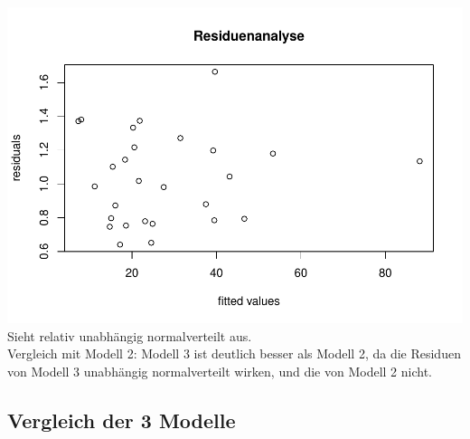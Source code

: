 \documentclass[]{article}
\newenvironment{Shaded}{\begin{snugshade}}{\end{snugshade}}
\newcommand{\DataTypeTok}[1]{\textcolor[rgb]{0.13,0.29,0.53}{#1}}
\newcommand{\KeywordTok}[1]{\textcolor[rgb]{0.13,0.29,0.53}{\textbf{#1}}}
\newcommand{\NormalTok}[1]{#1}
\newcommand{\OperatorTok}[1]{\textcolor[rgb]{0.81,0.36,0.00}{\textbf{#1}}}
\newcommand{\StringTok}[1]{\textcolor[rgb]{0.31,0.60,0.02}{#1}}
\begin{document}
\begin{Shaded}
\end{Shaded}

\includegraphics{Test_files/figure-latex/unnamed-chunk-23-1.pdf}
Sieht relativ unabhängig normalverteilt aus.\\
Vergleich mit Modell 2:
Modell 3 ist deutlich besser als Modell 2, da die Residuen von Modell 3 unabhängig normalverteilt wirken, und die von Modell 2 nicht.

\hypertarget{vergleich-der-3-modelle}{%
\subsection{Vergleich der 3 Modelle}\label{vergleich-der-3-modelle}}
\end{document}
